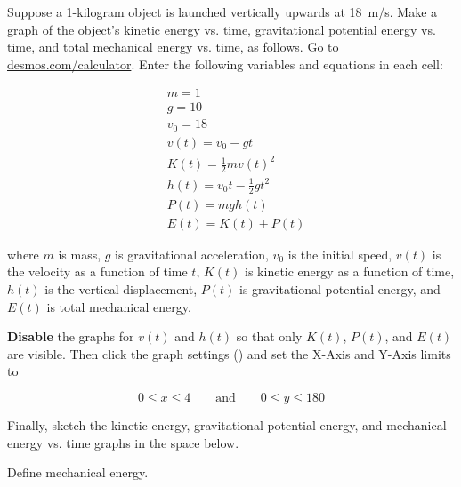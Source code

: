 \documentclass[../main-physics-problems.tex]{subfiles}
\begin{document}
\begin{questions}
\question
Suppose a 1-kilogram object is launched vertically upwards at \SI{18}{m/s}. Make a graph of the object's kinetic energy vs. time, gravitational potential energy vs. time, and total mechanical energy vs. time, as follows. Go to \href{https://www.desmos.com/calculator}{desmos.com/calculator}. Enter the following variables and equations in each cell:

\begin{align*}
    & m = 1 \\[1ex]
    & g = 10 \\[1ex]
    & v_0 = 18 \\[1ex]
    & v(t) = v_0 - gt \\[1ex]
    & K(t) = \frac{1}{2} m v\left(t\right)^2 \\[1ex]
    & h(t) = v_0 t - \frac{1}{2}g t^2 \\[1ex]
    & P(t) = mg h(t) \\[1ex]
    & E(t) = K(t) + P(t)
\end{align*}

where $m$ is mass, $g$ is gravitational acceleration, $v_0$ is the initial speed, $v(t)$ is the velocity as a function of time $t$, $K(t)$ is kinetic energy as a function of time, $h(t)$ is the vertical displacement, $P(t)$ is gravitational potential energy, and $E(t)$ is total mechanical energy.

\textbf{Disable} the graphs for $v(t)$ and $h(t)$ so that only $K(t)$, $P(t)$, and $E(t)$ are visible. Then click the graph settings (\faWrench) and set the X-Axis and Y-Axis limits to

\begin{equation*}
    0 \leq x \leq 4 \qquad \text{and} \qquad
    0 \leq y \leq 180
\end{equation*}

Finally, sketch the kinetic energy, gravitational potential energy, and mechanical energy vs. time graphs in the space below.

\begin{center}
\end{center}


\question \label{2EkX0c}
Define mechanical energy.




\end{questions}
\end{document}
